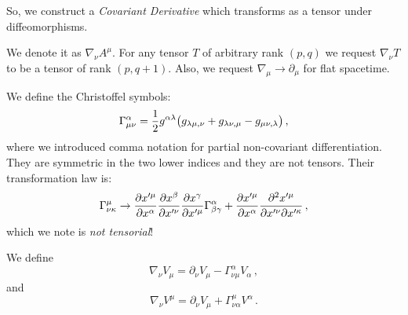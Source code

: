 \documentclass[main.tex]{subfiles}
\begin{document}
So, we construct a \emph{Covariant Derivative} which transforms as a tensor under diffeomorphisms.

We denote it as \(\nabla_\nu A^{\mu }\).
For any tensor \(T\) of arbitrary rank \((p, q)\) we request \(\nabla_\nu T\) to be a tensor of rank \((p, q+1)\).
Also, we request \(\nabla_\mu \rightarrow \partial_\mu\) for flat spacetime.

We define the Christoffel symbols: 
%
\begin{equation}
  \Gamma_{\mu \nu }^{\alpha } =
  \frac{1}{2} g^{\alpha \lambda } \qty(g_{\lambda \mu , \nu }+ g_{\lambda \nu , \mu } - g_{\mu \nu , \lambda })
\,,
\end{equation}
%
where we introduced comma notation for partial non-covariant differentiation.
They are symmetric in the two lower indices and they are not tensors. Their transformation law is: 
%
\begin{equation}
  \Gamma_{\nu \kappa }^{\mu }\rightarrow
  \pdv{x^{\prime \mu }}{x^{\alpha }} \pdv{x^{\beta }}{x^{\prime \nu }} \pdv{x^{\gamma }}{x^{\prime \mu }} \Gamma^{\alpha }_{\beta \gamma } + 
  \pdv{x^{\prime \mu }}{x^{\alpha }} \pdv[2]{x^{\prime \mu }}{x^{\prime \nu }}{x^{\prime \kappa }}  
\,,
\end{equation}
%
which we note is \emph{not tensorial}!

We define 
%
\begin{equation}
    \nabla_{\nu }V_{\mu } = \partial_{\nu } V_\mu - \Gamma_{\nu \mu }^{\alpha } V_{\alpha }
\,,
\end{equation}
%
and 
%
\begin{equation}
    \nabla_{\nu }V^{\mu} = \partial_{\nu } V_\mu + \Gamma_{\nu \alpha  }^{\mu  } V^{\alpha }
\,.
\end{equation}
%
\end{document}
